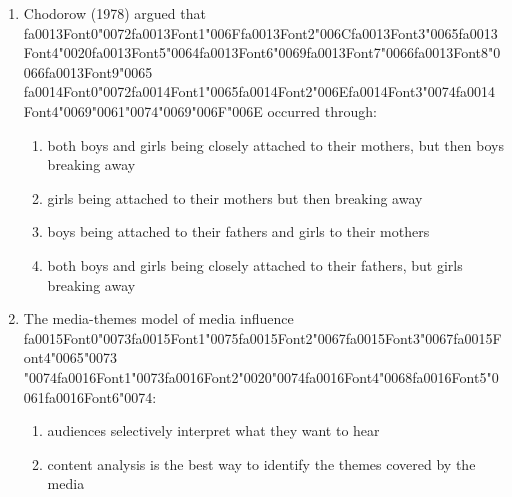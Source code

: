 \documentclass[12pt]{article}
\begin{document}
\begin{enumerate}[label=\arabic*.]
\begin{enumerate}[label=(\alph*)]
    \item A primary group
    \item A secondary group
    \item An aggregate
    \item A social category
\end{enumerate}
\item Chodorow (1978) argued that {\csname fa0013Font0\endcsname\char"0072}{\csname fa0013Font1\endcsname\char"006F}{\csname fa0013Font2\endcsname\char"006C}{\csname fa0013Font3\endcsname\char"0065}{\csname fa0013Font4\endcsname\char"0020}{\csname fa0013Font5\endcsname\char"0064}{\csname fa0013Font6\endcsname\char"0069}{\csname fa0013Font7\endcsname\char"0066}{\csname fa0013Font8\endcsname\char"0066}{\csname fa0013Font9\endcsname\char"0065} {\csname fa0014Font0\endcsname\char"0072}{\csname fa0014Font1\endcsname\char"0065}{\csname fa0014Font2\endcsname\char"006E}{\csname fa0014Font3\endcsname\char"0074}{\csname fa0014Font4\endcsname\char"0069}{\char"0061}{\char"0074}{\char"0069}{\char"006F}{\char"006E} occurred through:
\begin{enumerate}[label=(\alph*)]
    \item both boys and girls being closely attached to their mothers, but then boys breaking away
    \item girls being attached to their mothers but then breaking away
    \item boys being attached to their fathers and girls to their mothers
    \item both boys and girls being closely attached to their fathers, but girls breaking away
\end{enumerate}
\item The media-themes model of media influence {\csname fa0015Font0\endcsname\char"0073}{\csname fa0015Font1\endcsname\char"0075}{\csname fa0015Font2\endcsname\char"0067}{\csname fa0015Font3\endcsname\char"0067}{\csname fa0015Font4\endcsname\char"0065}{\char"0073} {\char"0074}{\csname fa0016Font1\endcsname\char"0073}{\csname fa0016Font2\endcsname\char"0020}{\char"0074}{\csname fa0016Font4\endcsname\char"0068}{\csname fa0016Font5\endcsname\char"0061}{\csname fa0016Font6\endcsname\char"0074}:
\begin{enumerate}[label=(\alph*)]
    \item audiences selectively interpret what they want to hear
    \item content analysis is the best way to identify the themes covered by the media

\end{enumerate}
\end{enumerate}
\end{document}
